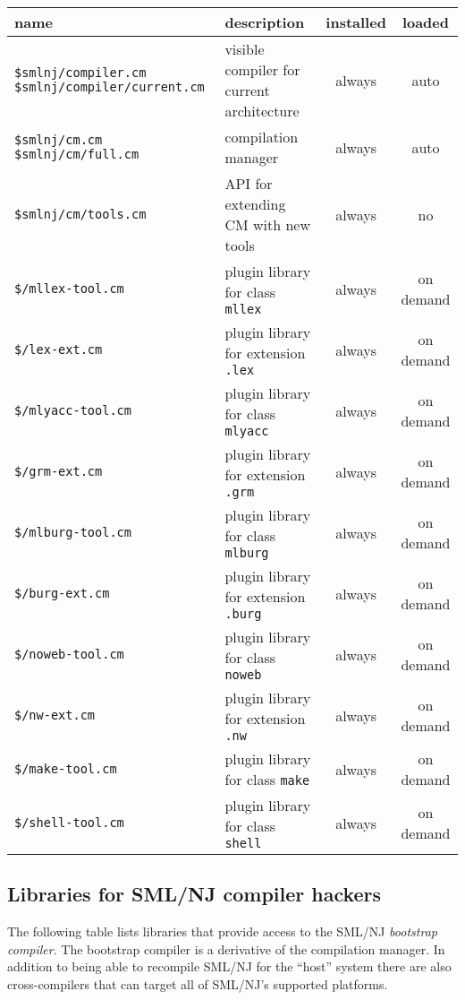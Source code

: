 \documentclass[titlepage,letterpaper]{article}
\begin{document}
\begin{center}
\begin{tabular}{p{2.3in}||p{2.5in}|c|c}
name & description & installed & loaded \\
\hline\hline
{\tt \$smlnj/compiler.cm} \newline
{\tt \$smlnj/compiler/current.cm} & visible compiler for current
architecture & always & auto \\
\hline\hline
{\tt \$smlnj/cm.cm} \newline
{\tt \$smlnj/cm/full.cm} & compilation manager & always & auto \\
\hline
{\tt \$smlnj/cm/tools.cm} & API for extending CM with new tools &
always & no \\
\hline\hline
{\tt \$/mllex-tool.cm} & plugin library for class {\tt mllex} & always
& on demand \\
\hline
{\tt \$/lex-ext.cm} & plugin library for extension {\tt .lex} & always
& on demand \\
\hline
{\tt \$/mlyacc-tool.cm} & plugin library for class {\tt mlyacc} &
always & on demand \\
\hline
{\tt \$/grm-ext.cm} & plugin library for extension {\tt .grm} & always
& on demand \\
\hline
{\tt \$/mlburg-tool.cm} & plugin library for class {\tt mlburg} &
always & on demand \\
\hline
{\tt \$/burg-ext.cm} & plugin library for extension {\tt .burg} &
always & on demand \\
\hline
{\tt \$/noweb-tool.cm} & plugin library for class {\tt noweb} & always
& on demand \\
\hline
{\tt \$/nw-ext.cm} & plugin library for extension {\tt .nw} & always &
on demand \\
\hline
{\tt \$/make-tool.cm} & plugin library for class {\tt make} & always &
on demand \\
\hline
{\tt \$/shell-tool.cm} & plugin library for class {\tt shell} & always
& on demand \\
\end{tabular}
\end{center}

\subsection{Libraries for SML/NJ compiler hackers}

The following table lists libraries that provide access to the SML/NJ
{\em bootstrap compiler}.  The bootstrap compiler is a derivative of
the compilation manager.  In addition to being able to recompile
SML/NJ for the ``host'' system there are also cross-compilers that
can target all of SML/NJ's supported platforms.
\end{document}

